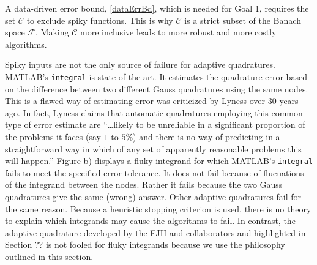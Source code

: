 \documentclass[11pt]{NSFamsart}
\newcommand{\calc}{{\mathcal{C}}}
\newcommand{\calf}{{\mathcal{F}}}
\begin{document}
A data-driven error bound, \eqref{dataErrBd}, which is needed for Goal 1, requires the set $\calc$ to exclude spiky functions.  This is why $\calc$ is a strict subset of the Banach space $\calf$.  Making $\calc$ more inclusive leads to more robust and more costly algorithms.

Spiky inputs are not the only source of failure for adaptive quadratures. 
MATLAB's
\texttt{integral} \cite{Sha08a, MAT9.5} is state-of-the-art.  It estimates the quadrature error based on the difference between two different Gauss quadratures using the same nodes. This is a flawed way of estimating error was criticized by 
Lyness \cite[p.\ 69]{Lyn83} over 30 years ago.  In fact, Lyness claims that automatic quadratures employing this common type of error estimate are ``\ldots likely to be unreliable in a significant proportion of the problems it faces 
	(say $1$ to $5\%$) and there is no way of predicting in a straightforward way in which of any set
	of apparently reasonable problems this will happen.''
Figure \label{quadfailfig}b) displays a fluky integrand for which MATLAB's \texttt{integral} fails to meet the specified error tolerance.  It does not fail because of flucuations of the integrand between the nodes.  Rather it fails because the two Gauss quadratures give the same (wrong) answer.  Other adaptive quadratures fail for the same reason.  Because a heuristic stopping criterion is used, there is no theory to explain which integrands may cause the algorithms to fail.  In contrast, the adaptive quadrature developed by the FJH and collaborators \cite{HicEtal14b, Zha18a} and highlighted in Section ?? is not fooled for fluky integrands because we use the philosophy outlined in this section.
\end{document}
